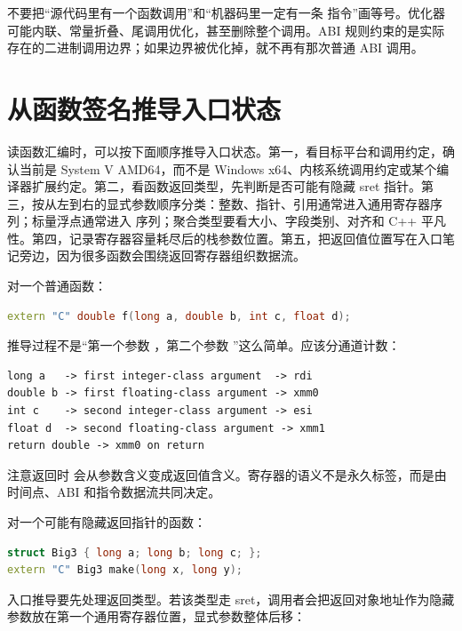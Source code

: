 \begin{warningbox}
不要把“源代码里有一个函数调用”和“机器码里一定有一条  指令”画等号。优化器可能内联、常量折叠、尾调用优化，甚至删除整个调用。ABI 规则约束的是实际存在的二进制调用边界；如果边界被优化掉，就不再有那次普通 ABI 调用。
\end{warningbox}

\section{从函数签名推导入口状态}

读函数汇编时，可以按下面顺序推导入口状态。第一，看目标平台和调用约定，确认当前是 System V AMD64，而不是 Windows x64、内核系统调用约定或某个编译器扩展约定。第二，看函数返回类型，先判断是否可能有隐藏 sret 指针。第三，按从左到右的显式参数顺序分类：整数、指针、引用通常进入通用寄存器序列；标量浮点通常进入  序列；聚合类型要看大小、字段类别、对齐和 C++ 平凡性。第四，记录寄存器容量耗尽后的栈参数位置。第五，把返回值位置写在入口笔记旁边，因为很多函数会围绕返回寄存器组织数据流。

对一个普通函数：

\begin{lstlisting}[language=C++]
extern "C" double f(long a, double b, int c, float d);
\end{lstlisting}

推导过程不是“第一个参数 ，第二个参数 ”这么简单。应该分通道计数：

\begin{lstlisting}
long a   -> first integer-class argument  -> rdi
double b -> first floating-class argument -> xmm0
int c    -> second integer-class argument -> esi
float d  -> second floating-class argument -> xmm1
return double -> xmm0 on return
\end{lstlisting}

注意返回时  会从参数含义变成返回值含义。寄存器的语义不是永久标签，而是由时间点、ABI 和指令数据流共同决定。

对一个可能有隐藏返回指针的函数：

\begin{lstlisting}[language=C++]
struct Big3 { long a; long b; long c; };
extern "C" Big3 make(long x, long y);
\end{lstlisting}

入口推导要先处理返回类型。若该类型走 sret，调用者会把返回对象地址作为隐藏参数放在第一个通用寄存器位置，显式参数整体后移：

